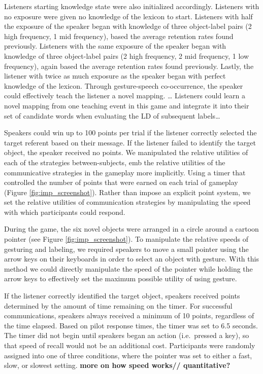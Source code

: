 \documentclass[10pt, letterpaper]{article}
\begin{document}
Listeners starting knowledge state were also initialized accordingly.
Listeners with no exposure were given no knowledge of the lexicon to
start. Listeners with half the exposure of the speaker began with
knowledge of three object-label pairs (2 high frequency, 1 mid
frequency), based the average retention rates found previously.
Listeners with the same exposure of the speaker began with knowledge of
three object-label pairs (2 high frequency, 2 mid frequency, 1 low
frequency), again based the average retention rates found previously.
Lastly, the listener with twice as much exposure as the speaker began
with perfect knowledge of the lexicon. Through gesture-speech
co-occurrence, the speaker could effectively teach the listener a novel
mapping. \ldots{} Listeners could learn a novel mapping from one
teaching event in this game and integrate it into their set of candidate
words when evaluating the LD of subsequent labels\ldots{}

Speakers could win up to 100 points per trial if the listener correctly
selected the target referent based on their message. If the listener
failed to identify the target object, the speaker received no points. We
manipulated the relative utilities of each of the strategies
between-subjects, emb the relative utilities of the communicative
strategies in the gameplay more implicitly. Using a timer that
controlled the number of points that were earned on each trial of
gameplay (Figure \ref{fig:imp_screenshot}). Rather than impose an
explicit point system, we set the relative utilities of communication
strategies by manipulating the speed with which participants could
respond.

During the game, the six novel objects were arranged in a circle around
a cartoon pointer (see Figure \ref{fig:imp_screenshot}). To manipulate
the relative speeds of gesturing and labeling, we required speakers to
move a small pointer using the arrow keys on their keyboards in order to
select an object with gesture. With this method we could directly
manipulate the speed of the pointer while holding the arrow keys to
effectively set the maximum possible utility of using gesture.

If the listener correctly identified the target object, speakers
received points determined by the amount of time remaining on the timer.
For successful communications, speakers always received a minimum of 10
points, regardless of the time elapsed. Based on pilot response times,
the timer was set to 6.5 seconds. The timer did not begin until speakers
began an action (i.e.~pressed a key), so that speed of recall would not
be an additional cost. Participants were randomly assigned into one of
three conditions, where the pointer was set to either a fast, slow, or
slowest setting. \textbf{more on how speed works// quantitative?}
\end{document}
